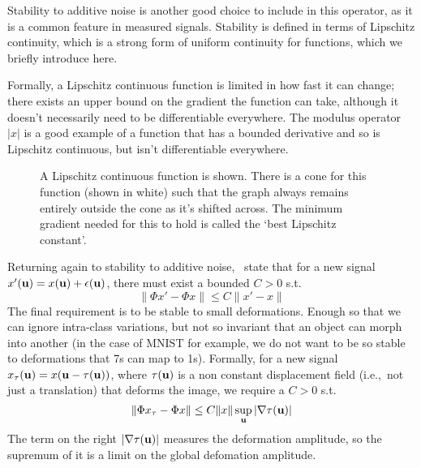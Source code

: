   Stability to additive noise is another good choice to include in this operator,
  as it is a common feature in measured signals. Stability is defined in terms of
  Lipschitz continuity, which is a strong form of uniform continuity for
  functions, which we briefly introduce here.

  Formally, a Lipschitz continuous function is limited in how fast it can change;
  there exists an upper bound on the gradient the function can take, although it
  doesn't necessarily need to be differentiable everywhere. The modulus operator
  $|x|$ is a good example of a function that has a bounded derivative and so is
  Lipschitz continuous, but isn't differentiable everywhere.

  \begin{figure}
    \begin{center}
      \caption[A Lipschitz continuous function]
              {A Lipschitz continuous function is shown. There is a cone for this
              function (shown in white) such that the graph always remains entirely outside
              the cone as it's shifted across. The minimum gradient needed for this to hold
              is called the `best Lipschitz constant'.}
      \label{fig:lipschitz}
    \end{center}
  \end{figure}

  Returning again to stability to additive noise, \Bruna\ state that for a new
  signal $x'(\mathbf{u}) = x(\mathbf{u}) + \epsilon(\mathbf{u})$, there must exist
  a bounded $C>0$ s.t.
  \begin{equation}\label{eq:scat_noise_stability}
    \|\Phi x' - \Phi x\| \leq C \|x' - x\|
  \end{equation}
  The final requirement is to be stable to small deformations. Enough so that we
  can ignore intra-class variations, but not so invariant that an object can
  morph into another (in the case of MNIST for example, we do not want to be so
  stable to deformations that 7s can map to 1s). Formally, for a new signal
  $x_{\tau}(\mathbf{u}) = x(\mathbf{u}-\tau(\mathbf{u}))$, where $\tau(\mathbf{u})$ is a non
  constant displacement field (i.e.,\ not just a translation) that deforms the
  image, we require a $C>0$ s.t.
  \protect\begin{equation}\label{eq:scat_deformation_stability}
    \|\Phi x_{\tau} - \Phi x \| \leq C \|x\| \sup_{\mathbf{u}} |\nabla\tau(\mathbf{u})|
  \protect\end{equation}
  The term on the right $|\nabla\tau(\mathbf{u})|$ measures the deformation
  amplitude, so the supremum of it is a limit on the global defomation amplitude.

